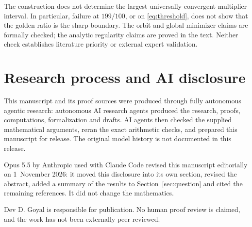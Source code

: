 \documentclass[11pt,a4paper]{article}
\theoremstyle{remark}
\begin{document}
The construction does not determine the largest universally convergent
multiplier interval. In particular, failure at $199/100$, or on
\eqref{eq:threshold}, does not show that the golden ratio is the sharp
boundary. The orbit and global minimizer claims are formally checked;
the analytic regularity claims are proved in the text. Neither check
establishes literature priority or external expert validation.

\section{Research process and AI disclosure}
This manuscript and its proof sources were produced through fully
autonomous agentic research: autonomous AI research agents produced the
research, proofs, computations, formalization and drafts. AI agents then
checked the supplied mathematical arguments, reran the exact arithmetic
checks, and prepared this manuscript for release. The original model
history is not documented in this release.

Opus 5.5 by Anthropic used with Claude Code revised this manuscript
editorially on 1~November 2026: it moved this disclosure into its own
section, revised the abstract, added a summary of the results to
Section~\ref{sec:question} and cited the remaining references. It did not
change the mathematics.

Dev D. Goyal is responsible for publication. No human proof review is
claimed, and the work has not been externally peer reviewed.


\end{document}
